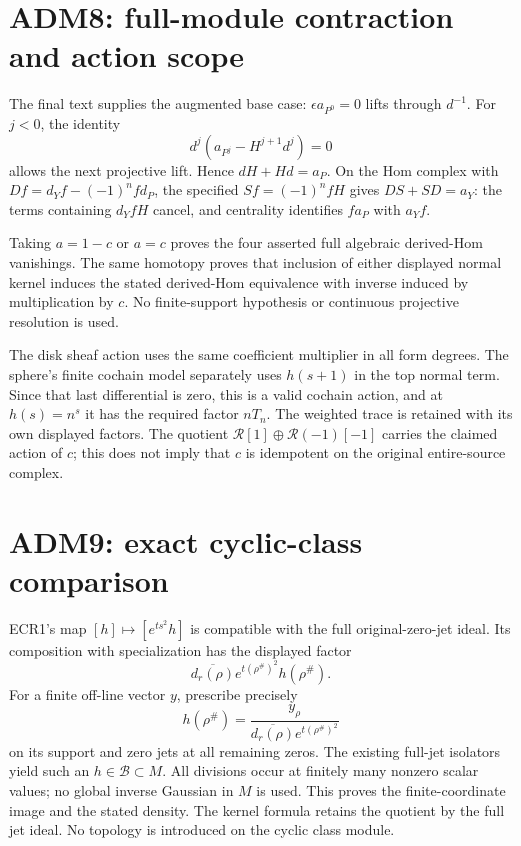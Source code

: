 \section{ADM8: full-module contraction and action
scope}\label{adm8-full-module-contraction-and-action-scope}

The final text supplies the augmented base case: \(\epsilon a_{P^0}=0\)
lifts through \(d^{-1}\). For \(j<0\), the identity \[
d^j(a_{P^j}-H^{j+1}d^j)=0
\] allows the next projective lift. Hence \(dH+Hd=a_P\). On the Hom
complex with \(Df=d_Yf-(-1)^nfd_P\), the specified \(Sf=(-1)^nfH\) gives
\(DS+SD=a_Y\): the terms containing \(d_YfH\) cancel, and centrality
identifies \(fa_P\) with \(a_Yf\).

Taking \(a=1-c\) or \(a=c\) proves the four asserted full algebraic
derived-Hom vanishings. The same homotopy proves that inclusion of
either displayed normal kernel induces the stated derived-Hom
equivalence with inverse induced by multiplication by \(c\). No
finite-support hypothesis or continuous projective resolution is used.

The disk sheaf action uses the same coefficient multiplier in all form
degrees. The sphere's finite cochain model separately uses \(h(s+1)\) in
the top normal term. Since that last differential is zero, this is a
valid cochain action, and at \(h(s)=n^s\) it has the required factor
\(nT_n\). The weighted trace is retained with its own displayed factors.
The quotient \(\mathcal R[1]\oplus\mathcal R(-1)[-1]\) carries the
claimed action of \(c\); this does not imply that \(c\) is idempotent on
the original entire-source complex.

\section{ADM9: exact cyclic-class
comparison}\label{adm9-exact-cyclic-class-comparison}

ECR1's map \([h]\mapsto[e^{ts^2}h]\) is compatible with the full
original-zero-jet ideal. Its composition with specialization has the
displayed factor \[
\overline{d_r(\rho)}e^{t(\rho^\#)^2}h(\rho^\#).
\] For a finite off-line vector \(y\), prescribe precisely \[
h(\rho^\#)
=\frac{y_\rho}{\overline{d_r(\rho)}e^{t(\rho^\#)^2}}
\] on its support and zero jets at all remaining zeros. The existing
full-jet isolators yield such an \(h\in\mathcal B\subset M\). All
divisions occur at finitely many nonzero scalar values; no global
inverse Gaussian in \(M\) is used. This proves the finite-coordinate
image and the stated density. The kernel formula retains the quotient by
the full jet ideal. No topology is introduced on the cyclic class
module.

